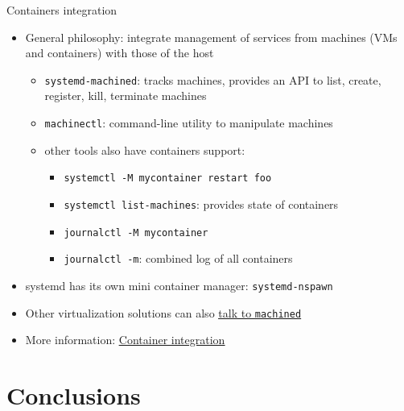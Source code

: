\documentclass[11pt,final,usepdftitle=false]{beamer}
\begin{document}
\begin{frame}{Containers integration}
\begin{itemize}
	\item General philosophy: \alert{integrate management of services from machines (VMs and containers) with those of the host}
	\begin{itemize}
		\item \texttt{systemd-machined}: tracks machines, provides an API to list, create, register, kill, terminate machines
			\hbr
		\item \texttt{machinectl}: command-line utility to manipulate machines
			\hbr
		\item other tools also have containers support:
			\begin{itemize}
				\item \texttt{systemctl -M mycontainer restart foo}
				\item \texttt{systemctl list-machines}: provides state of containers
				\item \texttt{journalctl -M mycontainer}
				\item \texttt{journalctl -m}: combined log of all containers
			\end{itemize}
	\end{itemize}
\hbr
\item systemd has its own mini container manager: \texttt{systemd-nspawn}
\hbr
\item Other virtualization solutions can also \href{http://www.freedesktop.org/wiki/Software/systemd/machined/}{\ul{talk to \texttt{machined}}}
\hbr
\item More information: \href{http://0pointer.net/blog/systemd-for-administrators-part-xxi.html}{\ul{Container integration}}
\end{itemize}
\end{frame}

\section{Conclusions}
\end{document}
